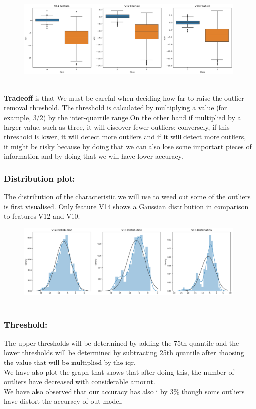 \documentclass{article}
\begin{document}
\begin{figure}[!h]
\centering
\includegraphics[width = 4 in]{img6.png}~
\end{figure}

\noindent\textbf{Tradeoff} is that We must be careful when deciding how far to raise the outlier removal threshold. The threshold is calculated by multiplying a value (for example, 3/2) by the inter-quartile range.On the other hand if multiplied by a larger value, such as three, it will discover fewer outliers; conversely, if this threshold is lower, it will detect more outliers and if it will detect more outliers, it might be risky because by doing that we can also lose some important pieces of information and by doing that we will have lower accuracy.

\subsubsection{Distribution plot:}
The distribution of the characteristic we will use to weed out some of the outliers is first visualised. Only feature V14 shows a Gaussian distribution in comparison to features V12 and V10.

\begin{figure}[!h]
\centering
\includegraphics[width = 4 in]{img5.png}~
\end{figure}

\subsubsection{Threshold:}
The upper thresholds will be determined by adding the 75th quantile and the lower thresholds will be determined by subtracting 25th quantile after choosing the value that will be multiplied by the iqr.\\
We have also plot the graph that shows that after doing this, the number of outliers have decreased with considerable amount.\\
We have also observed that our accuracy has also i by 3\% though some outliers have distort the accuracy of out model.
\end{document}
